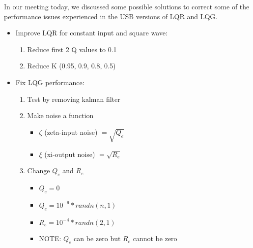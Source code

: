 \documentclass[fontsize=11pt, %
                             paper=letter, %
                             openany, %
                             captions=tableheading,
                             index=totoc,
                             hyperref]{labbook}
\begin{document}
\begin{addmargin}[0cm]{0cm}
In our meeting today, we discussed some possible solutions to correct some of the performance issues experienced in the USB versions of LQR and LQG.
\begin{itemize}
    \item Improve LQR for constant input and square wave:
        \begin{enumerate}
            \item Reduce first 2 Q values to 0.1
            \item Reduce K (0.95, 0.9, 0.8, 0.5)
        \end{enumerate}
    \item Fix LQG performance:
        \begin{enumerate}
            \item Test by removing kalman filter
            \item Make noise a function
                \begin{itemize}
                    \item $\zeta$ (zeta-input noise) $= \sqrt{Q_e}$
                    \item $\xi$ (xi-output noise) $= \sqrt{R_e}$
                \end{itemize}
            \item Change $Q_e$ and $R_e$ 
                \begin{itemize}
                    \item $Q_e = 0$
                    \item $Q_e = 10^{-9}*randn(n,1)$
                    \item $R_e = 10^{-4}*randn(2,1)$
                    \item NOTE: $Q_e$ can be zero but $R_e$ cannot be zero
                \end{itemize}
        \end{enumerate}
\end{itemize}


\end{addmargin}
\end{document}
